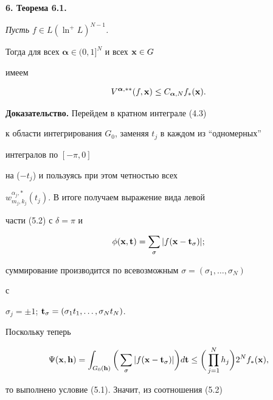 \addtocounter{section}{1}


\setcounter{equation}{0}


\setcounter{lems}{0}


\setcounter{thms}{0}








{\bf 6. Теорема 6.1.} {\it Пусть $f\in L(\ln^+ L)^{N-1}$.


Тогда для всех ${\boldsymbol{\alpha}}\in (0,1]^N$ и всех $ {\bold x}\in G$


имеем}


\begin{equation}


V^{{\boldsymbol{\alpha}},**}(f,{\bold x})\le C_{{\boldsymbol{\alpha}},N}


f_*({\bold x}).


\end{equation}





{\bf Доказательство.} Перейдем в кратном интеграле (4.3)


к области интегрирования $G_0$, заменяя $t_j$ в каждом из ``одномерных''


интегралов по $[-\pi,0]$


на ($-t_j$) и пользуясь при этом четностью всех


$w_{m_j,k_j}^{\alpha_j,*}(t_j)$. В итоге получаем выражение вида левой


части (5.2) с $\delta=\pi$ и


$$


\phi ({\bold x},{\bold t})=\sum_\sigma |f({\bold x}-{\bold t}_{\sigma})|;


$$


суммирование производится по всевозможным $\sigma=(\sigma_1,\dotsc,\sigma_N)$


с


$\sigma_j =\pm 1$; ${\bold t}_{\sigma}=(\sigma_1t_1,\dotsc,\sigma_N t_N)$.


Поскольку теперь


$$


\Psi ({\bold x},{\bold h})=\int_{G_0 ({\bold h})}


\bigg(\sum_\sigma |f({\bold x}-{\bold t}_{\sigma})|\bigg)d{\bold t}\le


\bigg(\prod_{j=1}^N h_j\bigg) 2^N f_*({\bold x}),


$$


то выполнено условие (5.1). Значит, из соотношения (5.2) 


